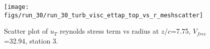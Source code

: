 \begin{figure}[H]
\centering
\texttt{[image: figs/run\_30/run\_30\_turb\_visc\_ettap\_top\_vs\_r\_meshscatter]}
\caption{Scatter plot of $
u_T$ reynolds stress term vs radius at $z/c$=7.75, $V_{free}$=32.94, station 3.}
\label{fig:run_30_turb_visc_ettap_top_vs_r_meshscatter}
\end{figure}


